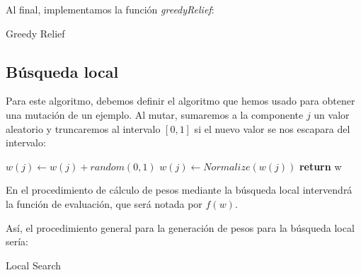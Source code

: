 \documentclass[11pt]{article}
\makeatletter
\def\BState{\State\hskip-\ALG@thistlm}
\makeatother
\begin{document}
Al final, implementamos la función \emph{greedyRelief}: 
\begin{algorithm}
\caption{Greedy Relief}\label{euclid}
\end{algorithm}

\subsection{Búsqueda local}
Para este algoritmo, debemos definir el algoritmo que hemos usado para obtener una mutación de un ejemplo. Al mutar, sumaremos a la componente $j$ un valor aleatorio y truncaremos al intervalo $[0,1]$ si el nuevo valor se nos escapara del intervalo:
\begin{algorithmic}[1]
\State $w(j) \gets w(j) + random(0,1)$
\State $w(j) \gets Normalize(w(j))$
\State \textbf{return} w
\EndProcedure
\end{algorithmic}
En el procedimiento de cálculo de pesos mediante la búsqueda local intervendrá la función de evaluación, que será notada por $f(w)$.

Así, el procedimiento general para la generación de pesos para la búsqueda local sería:





\begin{algorithm}
\caption{Local Search}\label{euclid}
\end{algorithm}
\end{document}
